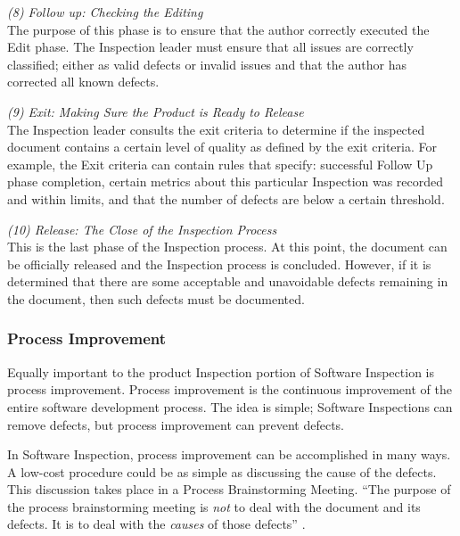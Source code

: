 \begin{flushleft}
  \textit{(8) Follow up: Checking the Editing} \\ The purpose of this phase
  is to ensure that the author correctly executed the Edit phase. The
  Inspection leader must ensure that all issues are correctly classified;
  either as valid defects or invalid issues and that the author has
  corrected all known defects.
\end{flushleft}

\begin{flushleft}
  \textit{(9) Exit: Making Sure the Product is Ready to Release} \\ The
  Inspection leader consults the exit criteria to determine if the
  inspected document contains a certain level of quality as defined by the
  exit criteria. For example, the Exit criteria can contain rules that
  specify: successful Follow Up phase completion, certain metrics about
  this particular Inspection was recorded and within limits, and that the
  number of defects are below a certain threshold.
\end{flushleft}

\begin{flushleft}
  \textit{(10) Release: The Close of the Inspection Process} \\ This is the
  last phase of the Inspection process. At this point, the document can be
  officially released and the Inspection process is concluded. However, if
  it is determined that there are some acceptable and unavoidable defects
  remaining in the document, then such defects must be documented.
\end{flushleft}


\subsubsection{Process Improvement}
Equally important to the product Inspection portion of Software Inspection
is process improvement. Process improvement is the continuous improvement
of the entire software development process. The idea is simple; Software
Inspections can remove defects, but process improvement can prevent
defects.

In Software Inspection, process improvement can be accomplished in many
ways. A low-cost procedure could be as simple as discussing the cause of
the defects. This discussion takes place in a Process Brainstorming
Meeting. ``The purpose of the process brainstorming meeting is \textit{not}
to deal with the document and its defects. It is to deal with the
\textit{causes} of those defects'' \cite{Gilb93}.

